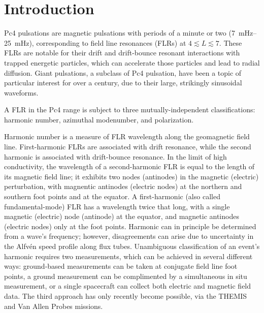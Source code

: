 \documentclass[draft,linenumbers]{agujournal}
\begin{document}

\section{Introduction}

Pc4 pulsations are magnetic pulsations with periods of a minute or two (\SIrange{7}{25}{\mHz}), corresponding to field line resonances (FLRs) at $4 \lesssim L \lesssim 7$\citep[and references therein]{anderson_1990}. These FLRs are notable for their drift and drift-bounce resonant interactions with trapped energetic particles\citep{southwood_1976}, which can accelerate those particles\citep{elkington_1999} and lead to radial diffusion\citep{elkington_2003}. Giant pulsations, a subclass of Pc4 pulsation, have been a topic of particular interest for over a century, due to their large, strikingly sinusoidal waveforms\citep{brekke_1987}.

A FLR in the Pc4 range is subject to three mutually-independent classifications: harmonic number, azimuthal modenumber, and polarization.

Harmonic number is a measure of FLR wavelength along the geomagnetic field line. First-harmonic FLRs are associated with drift resonance, while the second harmonic is associated with drift-bounce resonance\citep{dai_2013,poulter_1983}. In the limit of high conductivity, the wavelength of a second-harmonic FLR is equal to the length of its magnetic field line; it exhibits two nodes (antinodes) in the magnetic (electric) perturbation, with magnentic antinodes (electric nodes) at the northern and southern foot points and at the equator. A first-harmonic (also called fundamental-mode) FLR has a wavelength twice that long, with a single magnetic (electric) node (antinode) at the equator, and magnetic antinodes (electric nodes) only at the foot points. Harmonic can in principle be determined from a wave's frequency; however, disagreements can arise due to uncertainty in the Alfv\'en speed profile along flux tubes\citep{takahashi_2013}. Unambiguous classification of an event's harmonic requires two measurements, which can be achieved in several different ways: ground-based measurements can be taken at conjugate field line foot points, a ground measurement can be complimented by a simultaneous in situ measurement, or a single spacecraft can collect both electric and magnetic field data\citep{dai_2015}. The third approach has only recently become possible, via the THEMIS\citep{angelopoulos_2008} and Van Allen Probes\citep{stratton_2012} missions.
\end{document}
